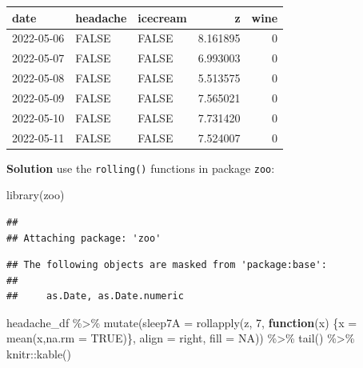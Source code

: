 \documentclass[
]{book}
\newenvironment{Shaded}{\begin{snugshade}}{\end{snugshade}}
\newcommand{\AttributeTok}[1]{\textcolor[rgb]{0.77,0.63,0.00}{#1}}
\newcommand{\ConstantTok}[1]{\textcolor[rgb]{0.00,0.00,0.00}{#1}}
\newcommand{\ControlFlowTok}[1]{\textcolor[rgb]{0.13,0.29,0.53}{\textbf{#1}}}
\newcommand{\DecValTok}[1]{\textcolor[rgb]{0.00,0.00,0.81}{#1}}
\newcommand{\FunctionTok}[1]{\textcolor[rgb]{0.00,0.00,0.00}{#1}}
\newcommand{\NormalTok}[1]{#1}
\newcommand{\OtherTok}[1]{\textcolor[rgb]{0.56,0.35,0.01}{#1}}
\newcommand{\SpecialCharTok}[1]{\textcolor[rgb]{0.00,0.00,0.00}{#1}}
\newcommand{\StringTok}[1]{\textcolor[rgb]{0.31,0.60,0.02}{#1}}
\begin{document}
\begin{tabular}{l|l|l|r|r}
\hline
date & headache & icecream & z & wine\\
\hline
2022-05-06 & FALSE & FALSE & 8.161895 & 0\\
\hline
2022-05-07 & FALSE & FALSE & 6.993003 & 0\\
\hline
2022-05-08 & FALSE & FALSE & 5.513575 & 0\\
\hline
2022-05-09 & FALSE & FALSE & 7.565021 & 0\\
\hline
2022-05-10 & FALSE & FALSE & 7.731420 & 0\\
\hline
2022-05-11 & FALSE & FALSE & 7.524007 & 0\\
\hline
\end{tabular}

\textbf{Solution} use the \texttt{rolling()} functions in package \texttt{zoo}:

\begin{Shaded}
\begin{Highlighting}[]
\FunctionTok{library}\NormalTok{(zoo)}
\end{Highlighting}
\end{Shaded}

\begin{verbatim}
## 
## Attaching package: 'zoo'
\end{verbatim}

\begin{verbatim}
## The following objects are masked from 'package:base':
## 
##     as.Date, as.Date.numeric
\end{verbatim}

\begin{Shaded}
\begin{Highlighting}[]
\NormalTok{headache\_df }\SpecialCharTok{\%\textgreater{}\%} 
    \FunctionTok{mutate}\NormalTok{(}\AttributeTok{sleep7A =} \FunctionTok{rollapply}\NormalTok{(z,}
                               \DecValTok{7}\NormalTok{, }
                               \ControlFlowTok{function}\NormalTok{(x) \{x }\OtherTok{=} \FunctionTok{mean}\NormalTok{(x,}\AttributeTok{na.rm =} \ConstantTok{TRUE}\NormalTok{)\},}
                               \AttributeTok{align =} \StringTok{\textquotesingle{}right\textquotesingle{}}\NormalTok{,}
                               \AttributeTok{fill =} \ConstantTok{NA}\NormalTok{)) }\SpecialCharTok{\%\textgreater{}\%} 
  \FunctionTok{tail}\NormalTok{() }\SpecialCharTok{\%\textgreater{}\%}\NormalTok{ knitr}\SpecialCharTok{::}\FunctionTok{kable}\NormalTok{()}
\end{Highlighting}
\end{Shaded}
\end{document}
